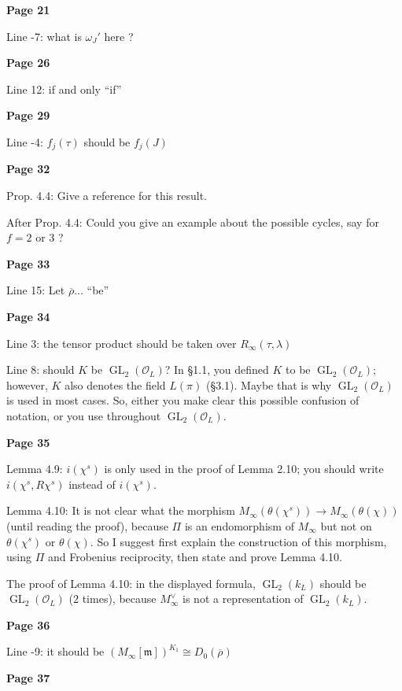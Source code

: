 \documentclass{amsart}
\newcommand{\cO}{\mathcal{O}}
\DeclareMathOperator{\GL}{\mathrm GL}
\theoremstyle{definition}
\newcommand{\ra}{\rightarrow}
\newcommand{\vv}{\vspace{2mm}}
\begin{document}
 \noindent\textbf{Page 21}
 
 Line -7:  what is $\omega_J'$ here ?
 

 \vv
 \noindent\textbf{Page 26}
 
 Line 12: if and only ``if''  

\vv

 \noindent\textbf{Page 29}
 
Line -4: $f_j(\tau)$ should be $f_j(J)$
 
 
\vv

 \noindent\textbf{Page 32}
 
Prop. 4.4: Give a reference for this result. 

After Prop. 4.4: Could you give an example about the possible cycles, say for $f=2$ or $3$ ?
  

\vv
 \noindent\textbf{Page 33}
 
Line 15: Let $\overline{\rho}...$ ``be''  
\vv

 \noindent\textbf{Page 34}

Line 3:  the tensor product should be taken over  $R_{\infty}(\tau,\lambda)$ 

Line 8: should $K$ be $\GL_2(\cO_L)$? In \S1.1, you defined $K$ to be $\GL_2(\cO_L)$; however, $K$ also denotes the field $L(\pi)$ (\S3.1). Maybe that is why $\GL_2(\cO_L)$ is used in most cases. So, either you make clear this possible confusion of notation, or you use throughout $\GL_2(\cO_L)$. 

\vv
 \noindent\textbf{Page 35}

Lemma 4.9: $i(\chi^s)$ is only used in the proof of Lemma 2.10; you should write $i(\chi^s,R\chi^s)$ instead of $i(\chi^s)$.

Lemma 4.10: It is not clear what the morphism $M_{\infty}(\theta(\chi^s))\ra M_{\infty}(\theta(\chi))$ (until reading the proof), because $\Pi$ is an endomorphism of $M_{\infty}$ but not on $\theta(\chi^s)$ or $\theta(\chi)$. So I suggest first explain the construction of this morphism, using $\Pi$ and Frobenius reciprocity, then state and prove Lemma 4.10.

The proof of Lemma 4.10: in the displayed formula, $\GL_2(k_L)$ should be $\GL_2(\cO_L)$ ($2$ times), because $M_{\infty}^{\vee}$ is not a representation of $\GL_2(k_L)$.

\vv
 \noindent\textbf{Page 36}
 
Line -9: it should be $(M_{\infty}[\mathfrak{m}])^{K_1}\cong D_0(\overline{\rho})$

\vv
 \noindent\textbf{Page 37}
 
\end{document}
